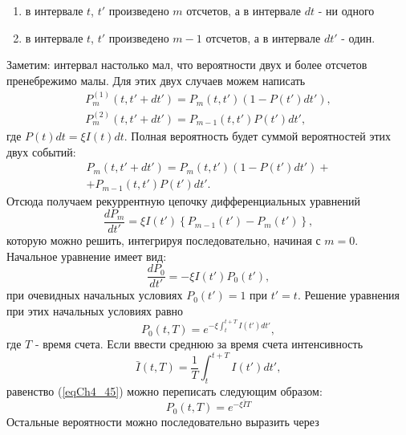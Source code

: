 \begin{enumerate}
\item в интервале $t$, $t'$ произведено $m$ отсчетов, а в интервале
  $dt$ - ни одного
\item в интервале $t$, $t'$ произведено  $m - 1$ отсчетов, а в
интервале $dt'$ - один.
\end{enumerate}
Заметим: интервал настолько мал, что вероятности двух и более отсчетов пренебрежимо малы. Для этих двух случаев можем написать
\begin{eqnarray}
P_m^{(1)}\left(t, t' + dt'\right) = 
P_m\left(t, t'\right)\left(1 - P\left(t'\right)dt'\right),
\nonumber \\
P_m^{(2)}\left(t, t' + dt'\right) = 
P_{m - 1}\left(t, t'\right)P\left(t'\right)dt',
\label{eqCh4_41}
\end{eqnarray}
где $P\left(t\right)dt = \xi I\left(t\right)dt$.  
Полная вероятность будет суммой вероятностей этих двух событий:
\begin{eqnarray}
P_m\left(t, t' + dt'\right) = 
P_m\left(t, t'\right)\left(1 - P\left(t'\right)dt'\right) +
\nonumber \\
+
P_{m - 1}\left(t, t'\right)P\left(t'\right)dt'.
\label{eqCh4_42}
\end{eqnarray}
Отсюда получаем рекуррентную цепочку дифференциальных уравнений
\begin{equation}
\frac{dP_m}{dt'} = \xi I\left(t'\right)\left\{P_{m - 1}\left(t'\right)
- P_m\left(t'\right)\right\},
\label{eqCh4_43}
\end{equation}
которую можно решить, интегрируя последовательно, начиная с $m =
0$. Начальное уравнение имеет вид: 
\begin{equation}
\frac{dP_0}{dt'} = - \xi I\left(t'\right) P_0\left(t'\right),
\label{eqCh4_44}
\end{equation}
при очевидных начальных условиях $P_0\left(t'\right) = 1$ при $t' =
t$.  Решение уравнения при этих начальных условиях равно 
\begin{equation}
P_0\left(t, T\right) = e^{- \xi \int_t^{t + T} I\left(t'\right) d t'}, 
\label{eqCh4_45}
\end{equation}
где $T$ - время счета. Если ввести среднюю за время счета
интенсивность 
\[
\bar{I}\left(t, T\right) = \frac{1}{T}
\int_t^{t + T}I\left(t'\right)dt',
\]
равенство (\ref{eqCh4_45}) можно переписать следующим образом:
\begin{equation}
P_0\left(t, T\right) = e^{- \xi \bar{I} T}
\label{eqCh4_46}
\end{equation}
Остальные вероятности можно последовательно выразить через

